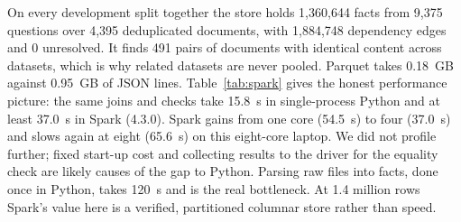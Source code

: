 On every development split together the store holds 1,360,644 facts from 9,375 questions over 4,395 deduplicated documents, with 1,884,748 dependency edges and 0 unresolved. It finds 491 pairs of documents with identical content across datasets, which is why related datasets are never pooled. Parquet takes 0.18~GB against 0.95~GB of JSON lines. Table~\ref{tab:spark} gives the honest performance picture: the same joins and checks take 15.8~s in single-process Python and at least 37.0~s in Spark (4.3.0). Spark gains from one core (54.5~s) to four (37.0~s) and slows again at eight (65.6~s) on this eight-core laptop. We did not profile further; fixed start-up cost and collecting results to the driver for the equality check are likely causes of the gap to Python. Parsing raw files into facts, done once in Python, takes 120~s and is the real bottleneck. At 1.4 million rows Spark's value here is a verified, partitioned columnar store rather than speed.
